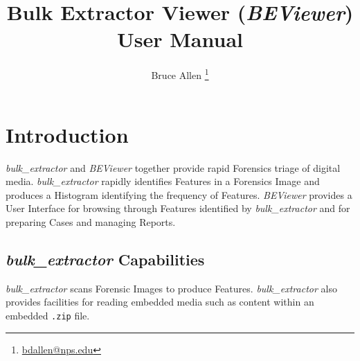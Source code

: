 \documentclass[10pt,twoside]{article}
\newcommand{\bulk}{\emph{bulk\_extractor}\xspace}
\newcommand{\bev}{\emph{BEViewer}\xspace}
\begin{document}
\noindent{}


\title{Bulk Extractor Viewer (\bev) User Manual}
\author{Bruce Allen \footnote{\href{mailto:bdallen@nps.edu}{bdallen@nps.edu}}}
\maketitle


\cleardoublepage
\setcounter{tocdepth}{2}
\tableofcontents
\cleardoublepage

\section{Introduction}
\bulk and \bev together provide rapid Forensics triage of digital media.
\bulk rapidly identifies \glspl{Feature} in a Forensics \gls{Image}
and produces a \gls{Histogram} identifying the frequency of Features.
\bev provides a User Interface for browsing through Features identified by \bulk
and for preparing \glspl{Case} and managing \glspl{Report}.

\subsection{\bulk Capabilities}
\bulk scans Forensic \glspl{Image} to produce \glspl{Feature}.
\bulk also provides facilities for reading embedded media
such as content within an embedded \texttt{.zip} file.
\end{document}
